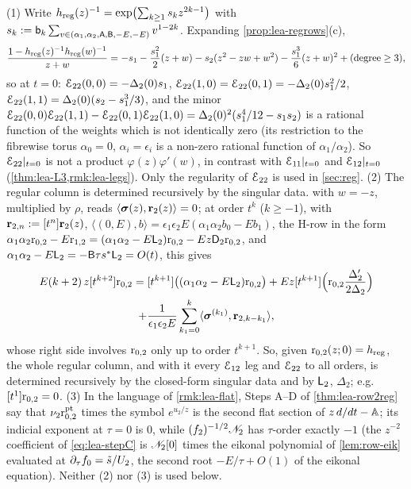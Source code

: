 \begin{rmk}[$\Edge_{22}$ at $t = 0$ is not of rank one; the regular column is determined by the singular data]
\label{rmk:lea-E22}
(1) Write $h_{\mathrm{reg}}(z)^{-1} = \exp\bigl(\sum_{k\geq 1}s_kz^{2k-1}\bigr)$ with $s_k := \mathsf{b}_k\sum_{v\in(\alpha_1,\alpha_2,\mathsf{A},\mathsf{B},-E,-E)}v^{1-2k}$. Expanding \cref{prop:lea-regrows}(c),
\[
\frac{1-h_{\mathrm{reg}}(z)^{-1}h_{\mathrm{reg}}(w)^{-1}}{z+w} = -s_1 - \frac{s_1^2}{2}(z+w) - s_2(z^2-zw+w^2) - \frac{s_1^3}{6}(z+w)^2 + (\text{degree}\geq 3),
\]
so at $t = 0$: $\mathcal{E}_{22}(0,0) = -\Delta_2(0)s_1$, $\mathcal{E}_{22}(1,0) = \mathcal{E}_{22}(0,1) = -\Delta_2(0)s_1^2/2$, $\mathcal{E}_{22}(1,1) = \Delta_2(0)(s_2 - s_1^3/3)$, and the minor $\mathcal{E}_{22}(0,0)\mathcal{E}_{22}(1,1) - \mathcal{E}_{22}(0,1)\mathcal{E}_{22}(1,0) = \Delta_2(0)^2(s_1^4/12 - s_1s_2)$ is a rational function of the weights which is not identically zero (its restriction to the fibrewise torus $\alpha_0 = 0$, $\alpha_i = \epsilon_i$ is a non-zero rational function of $\alpha_1/\alpha_2$). So $\mathcal{E}_{22}|_{t=0}$ is not a product $\varphi(z)\varphi'(w)$, in contrast with $\mathcal{E}_{11}|_{t=0}$ and $\mathcal{E}_{12}|_{t=0}$ (\cref{thm:lea-L3,rmk:lea-legs}). Only the regularity of $\Edge_{22}$ is used in \cref{sec:reg}. (2) The regular column is determined recursively by the singular data.  with $w = -z$, multiplied by $\rho$, reads $\langle\boldsymbol{\sigma}(z),\mathbf{r}_2(z)\rangle = 0$; at order $t^k$ ($k\geq -1$), with $\mathbf{r}_{2,n} := [t^n]\mathbf{r}_2(z)$, $\langle(0,E),b\rangle = \epsilon_1\epsilon_2E(\alpha_1\alpha_2b_0 - Eb_1)$, the H-row in the form $\alpha_1\alpha_2\mathrm{r}_{0,2} - E\mathrm{r}_{1,2} = (\alpha_1\alpha_2 - E\mathsf{L}_2)\mathrm{r}_{0,2} - Ez\mathsf{D}_2\mathrm{r}_{0,2}$, and $\alpha_1\alpha_2 - E\mathsf{L}_2 = -\mathsf{B}\tau s^{\ast}\mathsf{L}_2 = O(t)$, this gives
\begin{multline*}
E(k+2)\,z[t^{k+2}]\mathrm{r}_{0,2} = [t^{k+1}]\bigl((\alpha_1\alpha_2 - E\mathsf{L}_2)\mathrm{r}_{0,2}\bigr) + Ez[t^{k+1}]\Bigl(\mathrm{r}_{0,2}\frac{\Delta_2'}{2\Delta_2}\Bigr)\\
+ \frac{1}{\epsilon_1\epsilon_2E}\sum_{k_1=0}^{k}\langle\boldsymbol{\sigma}^{(k_1)},\mathbf{r}_{2,k-k_1}\rangle,
\end{multline*}
whose right side involves $\mathrm{r}_{0,2}$ only up to order $t^{k+1}$. So, given $\mathrm{r}_{0,2}(z;0) = h_{\mathrm{reg}}$, the whole regular column, and with it every $\mathcal{E}_{12}$ leg and $\Edge_{22}$ to all orders, is determined recursively by the closed-form singular data and by $\mathsf{L}_2$, $\Delta_2$; e.g.\ $[t^1]\mathrm{r}_{0,2} = 0$. (3) In the language of \cref{rmk:lea-flat}, Steps A--D of \cref{thm:lea-row2reg} say that $\nu_2\mathrm{r}^{\mathrm{pt}}_{0,2}$ times the symbol $e^{u_2/z}$ is the second flat section of $z\,d/dt - \mathbb{A}$; its indicial exponent at $\tau = 0$ is $0$, while $(f_2)^{-1/2}\mathscr{N}_{2}$ has $\tau$-order exactly $-1$ (the $z^{-2}$ coefficient of \eqref{eq:lea-stepC} is $\mathscr{N}_{2}[0]$ times the eikonal polynomial of \cref{lem:row-eik} evaluated at $\partial_\tau f_0 = \tilde{s}/U_2$, the second root $-E/\tau + O(1)$ of the eikonal equation). Neither (2) nor (3) is used below.
\end{rmk}

